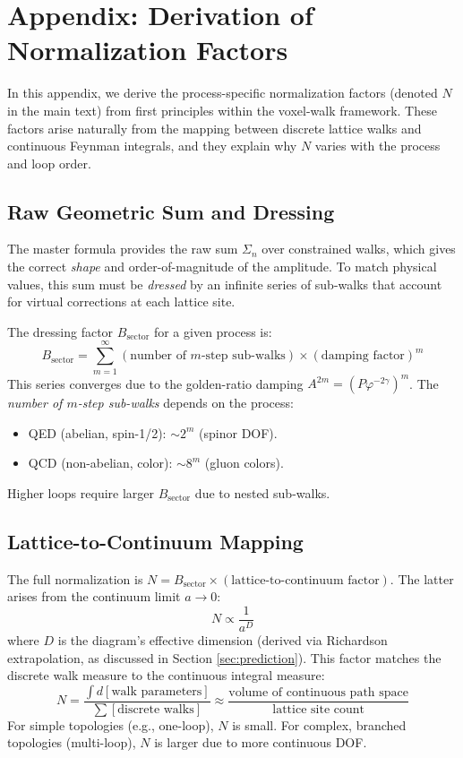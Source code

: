 \documentclass[11pt,a4paper]{article}
\theoremstyle{definition}
\theoremstyle{remark}
\begin{document}
\section{Appendix: Derivation of Normalization Factors}
\label{app:normalization}

In this appendix, we derive the process-specific normalization factors (denoted $N$ in the main text) from first principles within the voxel-walk framework. These factors arise naturally from the mapping between discrete lattice walks and continuous Feynman integrals, and they explain why $N$ varies with the process and loop order.

\subsection{Raw Geometric Sum and Dressing}
The master formula provides the raw sum $\Sigma_n$ over constrained walks, which gives the correct \emph{shape} and order-of-magnitude of the amplitude. To match physical values, this sum must be \emph{dressed} by an infinite series of sub-walks that account for virtual corrections at each lattice site.

The dressing factor $B_\text{sector}$ for a given process is:
\[
B_\text{sector} = \sum_{m=1}^\infty \left( \text{number of $m$-step sub-walks} \right) \times (\text{damping factor})^m
\]
This series converges due to the golden-ratio damping $A^{2m} = (P\varphi^{-2\gamma})^m$. The \emph{number of $m$-step sub-walks} depends on the process:
\begin{itemize}
\item QED (abelian, spin-1/2): $\sim 2^m$ (spinor DOF).
\item QCD (non-abelian, color): $\sim 8^m$ (gluon colors).
\end{itemize}
Higher loops require larger $B_\text{sector}$ due to nested sub-walks.

\subsection{Lattice-to-Continuum Mapping}
The full normalization is $N = B_\text{sector} \times \left( \text{lattice-to-continuum factor} \right)$. The latter arises from the continuum limit $a \to 0$:
\[
N \propto \frac{1}{a^D}
\]
where $D$ is the diagram's effective dimension (derived via Richardson extrapolation, as discussed in Section \ref{sec:prediction}). This factor matches the discrete walk measure to the continuous integral measure:
\[
N = \frac{\int d[\text{walk parameters}]}{\sum[\text{discrete walks}]} \approx \frac{\text{volume of continuous path space}}{\text{lattice site count}}
\]
For simple topologies (e.g., one-loop), $N$ is small. For complex, branched topologies (multi-loop), $N$ is larger due to more continuous DOF.
\end{document}
